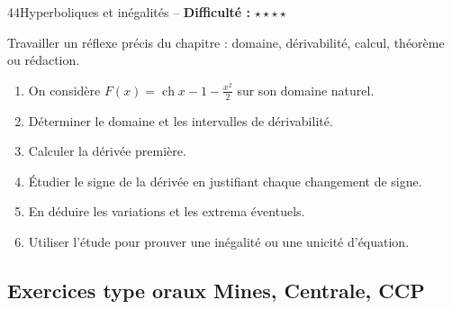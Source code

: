 \documentclass[11pt,a4paper]{article}
\newcommand{\ch}{\operatorname{ch}}
\newcommand{\etoiles}[1]{\textbf{Difficulté :} #1}
\begin{document}
\begin{exobox}{44}{Hyperboliques et inégalités -- \etoiles{$\star\star\star\star$}}

\begin{objectifbox}
Travailler un réflexe précis du chapitre : domaine, dérivabilité, calcul, théorème ou rédaction.
\end{objectifbox}

\begin{enumerate}

\item On considère $F(x)=\ch x-1-\frac{x^2}{2}$ sur son domaine naturel.

\item Déterminer le domaine et les intervalles de dérivabilité.

\item Calculer la dérivée première.

\item Étudier le signe de la dérivée en justifiant chaque changement de signe.

\item En déduire les variations et les extrema éventuels.

\item Utiliser l'étude pour prouver une inégalité ou une unicité d'équation.

\end{enumerate}

\end{exobox}


\subsection{Exercices type oraux Mines, Centrale, CCP}
\end{document}
